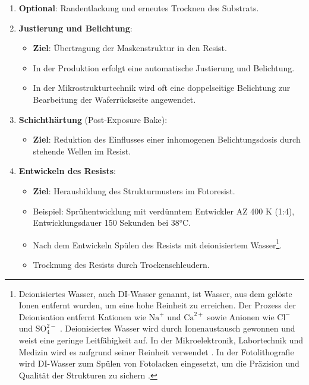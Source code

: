 \documentclass{article} %
\begin{document}
\begin{enumerate}
    \item \textbf{Optional}: Randentlackung und erneutes Trocknen des Substrats.

    \item \textbf{Justierung und Belichtung}:
    \begin{itemize}
        \item \textbf{Ziel}: Übertragung der Maskenstruktur in den Resist.
        \item In der Produktion erfolgt eine automatische Justierung und Belichtung.
        \item In der Mikrostrukturtechnik wird oft eine doppelseitige Belichtung zur Bearbeitung der Waferrückseite angewendet.
    \end{itemize}

    \item \textbf{Schichthärtung} (Post-Exposure Bake):
    \begin{itemize}
        \item \textbf{Ziel}: Reduktion des Einflusses einer inhomogenen Belichtungsdosis durch stehende Wellen im Resist.
    \end{itemize}

    \item \textbf{Entwickeln des Resists}:
    \begin{itemize}
        \item \textbf{Ziel}: Herausbildung des Strukturmusters im Fotoresist.
        \item Beispiel: Sprühentwicklung mit verdünntem Entwickler AZ 400 K (1:4), Entwicklungsdauer 150 Sekunden bei 38°C.
        \item Nach dem Entwickeln Spülen des Resists mit deionisiertem Wasser\footnote{Deionisiertes Wasser, auch DI-Wasser genannt, ist Wasser, aus dem gelöste Ionen entfernt wurden, um eine hohe Reinheit zu erreichen. Der Prozess der Deionisation entfernt Kationen wie $\mathrm{Na}^+$ und $\mathrm{Ca}^{2+}$ sowie Anionen wie $\mathrm{Cl}^-$ und $\mathrm{SO}_4^{2-}$ \cite{swatchuk2008, weast2004}. Deionisiertes Wasser wird durch Ionenaustausch gewonnen und weist eine geringe Leitfähigkeit auf. In der Mikroelektronik, Labortechnik und Medizin wird es aufgrund seiner Reinheit verwendet \cite{handbook2007}. In der Fotolithografie wird DI-Wasser zum Spülen von Fotolacken eingesetzt, um die Präzision und Qualität der Strukturen zu sichern \cite{peeters1994}.}.    
        \item Trocknung des Resists durch Trockenschleudern.
    \end{itemize}


\end{enumerate}
\end{document}
